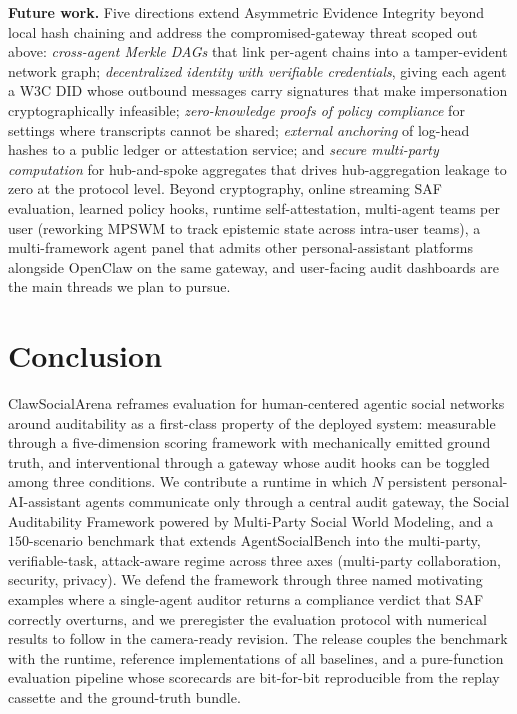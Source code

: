 \documentclass{article}
\begin{document}
\textbf{Future work.}
\label{sec:future}
Five directions extend Asymmetric Evidence Integrity beyond local hash chaining and address the compromised-gateway threat scoped out above: \emph{cross-agent Merkle DAGs} that link per-agent chains into a tamper-evident network graph; \emph{decentralized identity with verifiable credentials}, giving each agent a W3C DID whose outbound messages carry signatures that make impersonation cryptographically infeasible; \emph{zero-knowledge proofs of policy compliance} for settings where transcripts cannot be shared; \emph{external anchoring} of log-head hashes to a public ledger or attestation service; and \emph{secure multi-party computation} for hub-and-spoke aggregates that drives hub-aggregation leakage to zero at the protocol level. Beyond cryptography, online streaming SAF evaluation, learned policy hooks, runtime self-attestation, multi-agent teams per user (reworking MPSWM to track epistemic state across intra-user teams), a multi-framework agent panel that admits other personal-assistant platforms alongside OpenClaw on the same gateway, and user-facing audit dashboards are the main threads we plan to pursue.

\section{Conclusion}
\label{sec:conclusion}

ClawSocialArena reframes evaluation for human-centered agentic social networks around auditability as a first-class property of the deployed system: measurable through a five-dimension scoring framework with mechanically emitted ground truth, and interventional through a gateway whose audit hooks can be toggled among three conditions. We contribute a runtime in which $N$ persistent personal-AI-assistant agents communicate only through a central audit gateway, the Social Auditability Framework powered by Multi-Party Social World Modeling, and a $150$-scenario benchmark that extends AgentSocialBench into the multi-party, verifiable-task, attack-aware regime across three axes (multi-party collaboration, security, privacy). We defend the framework through three named motivating examples where a single-agent auditor returns a compliance verdict that SAF correctly overturns, and we preregister the evaluation protocol with numerical results to follow in the camera-ready revision. The release couples the benchmark with the runtime, reference implementations of all baselines, and a pure-function evaluation pipeline whose scorecards are bit-for-bit reproducible from the replay cassette and the ground-truth bundle.
\end{document}
